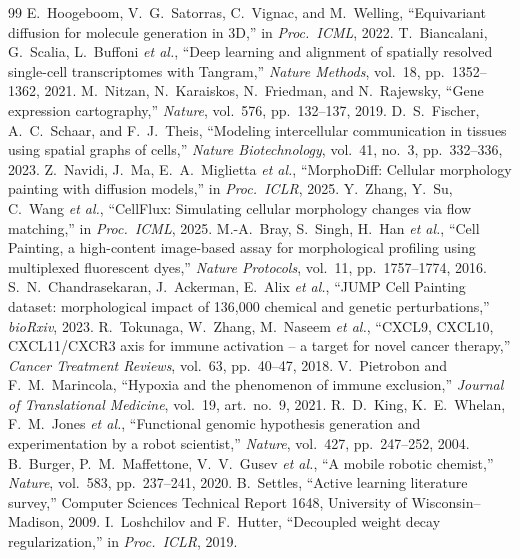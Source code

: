 \documentclass[journal]{IEEEtran}
\begin{document}
\begin{thebibliography}{99}
 E.~Hoogeboom, V.~G.~Satorras, C.~Vignac, and M.~Welling, ``Equivariant diffusion for molecule generation in 3D,'' in \emph{Proc.\ ICML}, 2022.
 T.~Biancalani, G.~Scalia, L.~Buffoni \emph{et al.}, ``Deep learning and alignment of spatially resolved single-cell transcriptomes with Tangram,'' \emph{Nature Methods}, vol.~18, pp.~1352--1362, 2021.
 M.~Nitzan, N.~Karaiskos, N.~Friedman, and N.~Rajewsky, ``Gene expression cartography,'' \emph{Nature}, vol.~576, pp.~132--137, 2019.
 D.~S.~Fischer, A.~C.~Schaar, and F.~J.~Theis, ``Modeling intercellular communication in tissues using spatial graphs of cells,'' \emph{Nature Biotechnology}, vol.~41, no.~3, pp.~332--336, 2023.
 Z.~Navidi, J.~Ma, E.~A.~Miglietta \emph{et al.}, ``MorphoDiff: Cellular morphology painting with diffusion models,'' in \emph{Proc.\ ICLR}, 2025.
 Y.~Zhang, Y.~Su, C.~Wang \emph{et al.}, ``CellFlux: Simulating cellular morphology changes via flow matching,'' in \emph{Proc.\ ICML}, 2025.
 M.-A.~Bray, S.~Singh, H.~Han \emph{et al.}, ``Cell Painting, a high-content image-based assay for morphological profiling using multiplexed fluorescent dyes,'' \emph{Nature Protocols}, vol.~11, pp.~1757--1774, 2016.
 S.~N.~Chandrasekaran, J.~Ackerman, E.~Alix \emph{et al.}, ``JUMP Cell Painting dataset: morphological impact of 136,000 chemical and genetic perturbations,'' \emph{bioRxiv}, 2023.
 R.~Tokunaga, W.~Zhang, M.~Naseem \emph{et al.}, ``CXCL9, CXCL10, CXCL11/CXCR3 axis for immune activation -- a target for novel cancer therapy,'' \emph{Cancer Treatment Reviews}, vol.~63, pp.~40--47, 2018.
 V.~Pietrobon and F.~M.~Marincola, ``Hypoxia and the phenomenon of immune exclusion,'' \emph{Journal of Translational Medicine}, vol.~19, art.~no.~9, 2021.
 R.~D.~King, K.~E.~Whelan, F.~M.~Jones \emph{et al.}, ``Functional genomic hypothesis generation and experimentation by a robot scientist,'' \emph{Nature}, vol.~427, pp.~247--252, 2004.
 B.~Burger, P.~M.~Maffettone, V.~V.~Gusev \emph{et al.}, ``A mobile robotic chemist,'' \emph{Nature}, vol.~583, pp.~237--241, 2020.
 B.~Settles, ``Active learning literature survey,'' Computer Sciences Technical Report 1648, University of Wisconsin--Madison, 2009.
 I.~Loshchilov and F.~Hutter, ``Decoupled weight decay regularization,'' in \emph{Proc.\ ICLR}, 2019.
\end{thebibliography}
\end{document}
